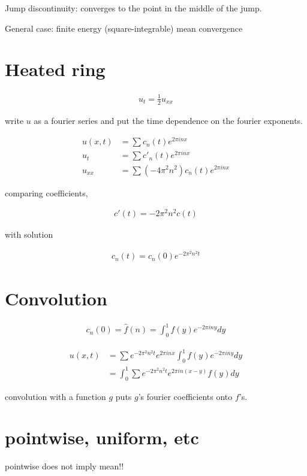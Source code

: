 \documentclass{article}
\begin{document}
Jump discontinuity: converges to the point in the middle of the jump.

General case: finite energy (square-integrable) mean convergence

\section{Heated ring}

\begin{align}
u_t = \frac{1}{2}u_{xx}
\end{align}

write $u$ as a fourier series and put the time dependence on the fourier exponents.

\begin{align}
u(x,t) &= \sum c_n(t)e^{2\pi i n x} \\
u_t &= \sum c'_n(t)e^{2\pi i n x} \\
u_{xx} &= \sum (-4\pi^2n^2)c_n(t)e^{2\pi i n x}
\end{align}

comparing coefficients,

\begin{align}
c'(t) = -2\pi^2n^2c(t)
\end{align}

with solution

\begin{align}
c_n(t) = c_n(0)e^{-2\pi^2n^2t}
\end{align}

\section{Convolution}

\begin{align}
c_n(0) = \hat f(n) = \int_0^1 f(y) e^{-2\pi iny} dy
\end{align}

\begin{align}
u(x,t) &= \sum e^{-2\pi^2n^2t} e^{2\pi i n x} \int_0^1 f(y) e^{-2\pi iny} dy \\
&= \int_0^1 \sum e^{-2\pi^2n^2t} e^{2\pi i n (x-y)}  f(y) dy
\end{align}

convolution with a function $g$ puts $g$'s fourier coefficients onto $f$'s.

\section{pointwise, uniform, etc}

pointwise does not imply mean!!
\end{document}
